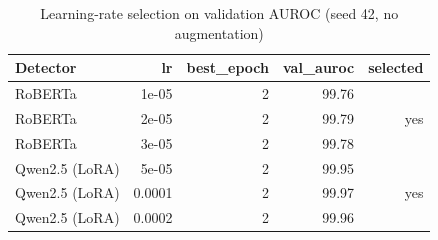 \begin{table}[!t]
\centering
\caption{Learning-rate selection on validation AUROC (seed 42, no augmentation)}
\label{tab:lr_tuning}
\footnotesize
\begin{tabular}{lrrrr}
\toprule
\textbf{Detector} & \textbf{lr} & \textbf{best\_epoch} & \textbf{val\_auroc} & \textbf{selected} \\
\midrule
RoBERTa & 1e-05 & 2 & 99.76 &  \\
RoBERTa & 2e-05 & 2 & 99.79 & yes \\
RoBERTa & 3e-05 & 2 & 99.78 &  \\
Qwen2.5 (LoRA) & 5e-05 & 2 & 99.95 &  \\
Qwen2.5 (LoRA) & 0.0001 & 2 & 99.97 & yes \\
Qwen2.5 (LoRA) & 0.0002 & 2 & 99.96 &  \\
\bottomrule
\end{tabular}
\end{table}
